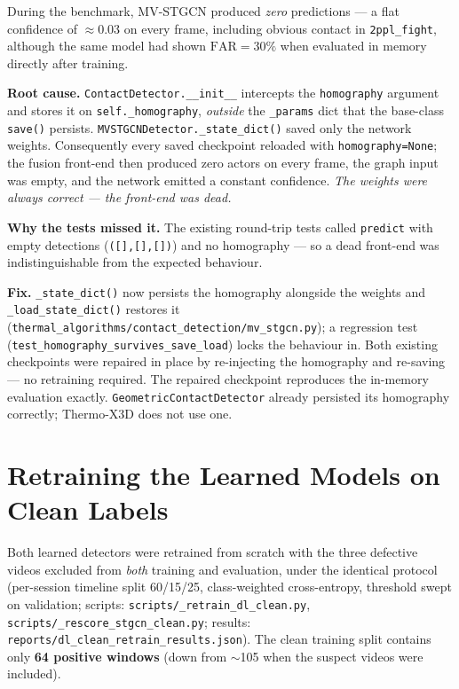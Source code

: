 \documentclass[11pt, a4paper]{article}
\begin{document}
During the benchmark, MV-STGCN produced \emph{zero} predictions --- a flat confidence of
$\approx0.03$ on every frame, including obvious contact in \texttt{2ppl\_fight}, although
the same model had shown $\mathrm{FAR}=30\%$ when evaluated in memory directly after
training.

\textbf{Root cause.} \texttt{ContactDetector.\_\_init\_\_} intercepts the
\texttt{homography} argument and stores it on \texttt{self.\_homography},
\emph{outside} the \texttt{\_params} dict that the base-class \texttt{save()} persists.
\texttt{MVSTGCNDetector.\_state\_dict()} saved only the network weights. Consequently
every saved checkpoint reloaded with \texttt{homography=None}; the fusion front-end then
produced zero actors on every frame, the graph input was empty, and the network emitted a
constant confidence. \emph{The weights were always correct --- the front-end was dead.}

\textbf{Why the tests missed it.} The existing round-trip tests called
\texttt{predict} with empty detections (\texttt{([],[],[])}) and no homography ---
so a dead front-end was indistinguishable from the expected behaviour.

\textbf{Fix.} \texttt{\_state\_dict()} now persists the homography alongside the weights
and \texttt{\_load\_state\_dict()} restores it
(\texttt{thermal\_algorithms/}\allowbreak\texttt{contact\_detection/}\allowbreak\texttt{mv\_stgcn.py}); a regression test
(\texttt{test\_homography\_survives\_save\_load}) locks the behaviour in. Both existing
checkpoints were repaired in place by re-injecting the homography and re-saving --- no
retraining required. The repaired checkpoint reproduces the in-memory evaluation exactly.
\texttt{GeometricContactDetector} already persisted its homography correctly; Thermo-X3D
does not use one.

\section{Retraining the Learned Models on Clean Labels}
\label{sec:retrain}

Both learned detectors were retrained from scratch with the three defective videos
excluded from \emph{both} training and evaluation, under the identical protocol
(per-session timeline split 60/15/25, class-weighted cross-entropy, threshold swept on
validation; scripts: \texttt{scripts/\_retrain\_dl\_clean.py},
\texttt{scripts/\_rescore\_stgcn\_clean.py}; results:
\texttt{reports/dl\_clean\_retrain\_results.json}). The clean training split contains
only \textbf{64 positive windows} (down from $\sim$105 when the suspect videos were
included).
\end{document}
